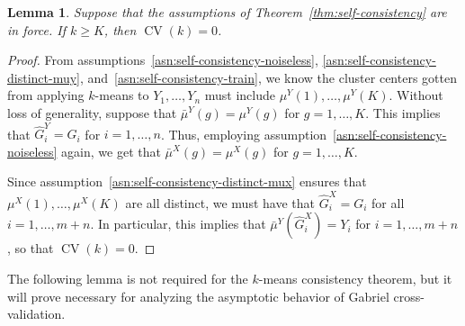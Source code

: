 \documentclass[11pt]{article}
\newtheorem{lemma}{Lemma}
\newcommand{\CV}{\operatorname{CV}}
\newcommand{\muX}{\mu^{X}}
\newcommand{\muY}{\mu^{Y}}
\newcommand{\bmuX}{\bar \mu^{X}}
\newcommand{\bmuY}{\bar \mu^{Y}}
\newcommand{\hGX}{\hat G^{X}}
\newcommand{\hGY}{\hat G^{Y}}
\begin{document}
\begin{lemma}
Suppose that the assumptions of Theorem~\ref{thm:self-consistency} are in
force.  If $k \geq K$, then $\CV(k) = 0$.
\end{lemma}
\begin{proof}
From assumptions~\ref{asn:self-consistency-noiseless},
\ref{asn:self-consistency-distinct-muy},
and~\ref{asn:self-consistency-train}, we know the cluster centers
gotten from applying $k$-means to $Y_1, \dotsc, Y_n$ must include
$\muY(1), \dotsc, \muY(K)$.  Without loss of generality, suppose that
$\bmuY(g) = \muY(g)$ for $g = 1, \dotsc, K$.  This implies that
$\hGY_i = G_i$ for $i = 1, \dotsc, n$.  Thus, employing
assumption~\ref{asn:self-consistency-noiseless} again, we get that
$\bmuX(g) = \muX(g)$ for $g = 1, \dotsc, K$.


Since assumption~\ref{asn:self-consistency-distinct-mux} ensures that
$\muX(1), \dotsc, \muX(K)$ are all distinct, we must have that $\hGX_i = G_i$
for all $i = 1, \dotsc, m+n$.  In particular, this implies that $\bmuY(\hGX_i)
= Y_i$ for $i = 1, \dotsc, m+n$, so that $\CV(k) = 0$.
\end{proof}

The following lemma is not required for the $k$-means consistency theorem, but
it will prove necessary for analyzing the asymptotic behavior of Gabriel
cross-validation.
\end{document}
